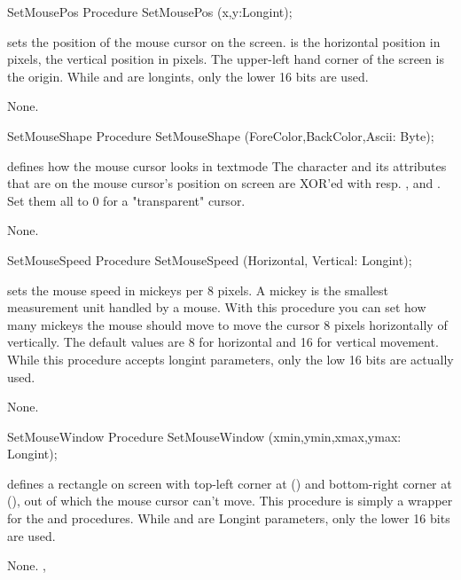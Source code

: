 
\begin{procedure}{SetMousePos}
\Declaration
Procedure SetMousePos (x,y:Longint);

\Description

 sets the position of the mouse cursor on the screen.
 is the horizontal position in pixels,  the vertical position
in pixels. The upper-left hand corner of the screen is the origin.
While  and  are longints, only the lower 16 bits are used.

\Errors
None.
\SeeAlso
{}
\end{procedure}


\begin{procedure}{SetMouseShape}
\Declaration
Procedure SetMouseShape (ForeColor,BackColor,Ascii: Byte);

\Description

defines how the mouse cursor looks in textmode
The character and its attributes that are on the mouse cursor's position on
screen are XOR'ed with resp. ,  and
. Set them all to 0 for a "transparent" cursor.

\Errors
None.
\SeeAlso
{}
\end{procedure}


\begin{procedure}{SetMouseSpeed}
\Declaration
Procedure SetMouseSpeed (Horizontal, Vertical: Longint);

\Description

 sets the mouse speed in mickeys per 8 pixels.
A mickey is the smallest measurement unit handled by a mouse. With this
procedure you can set how many mickeys the mouse should move to move the
cursor 8 pixels horizontally of vertically. The default values are 8 for
horizontal and 16 for vertical movement.
While this procedure accepts longint parameters, only the low 16 bits are
actually used.

\Errors
None.
\SeeAlso

\end{procedure}


\begin{procedure}{SetMouseWindow}
\Declaration
Procedure SetMouseWindow (xmin,ymin,xmax,ymax: Longint);

\Description

defines a rectangle on screen with top-left corner at () and
bottom-right corner at (), out of which the mouse 
cursor can't move.
This procedure is simply a wrapper for the  and 
 procedures.
While  and  are Longint parameters, 
only the lower 16 bits are used.

\Errors
None.
\SeeAlso
{}, 
\end{procedure}

